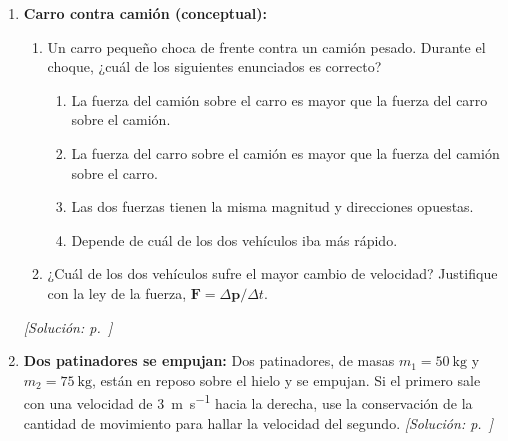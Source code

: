 \begin{enumerate}[label=\textbf{P\arabic*.}, ref=P\arabic*, leftmargin=*]
    \item\label{prob:parcial2-camion} \textbf{Carro contra camión
    (conceptual):}
    \begin{enumerate}[label=(\Roman*)]
        \item Un carro pequeño choca de frente contra un camión pesado.
        Durante el choque, ¿cuál de los siguientes enunciados es correcto?
        \begin{enumerate}[label=\alph*)]
            \item La fuerza del camión sobre el carro es mayor que la fuerza
            del carro sobre el camión.
            \item La fuerza del carro sobre el camión es mayor que la fuerza
            del camión sobre el carro.
            \item Las dos fuerzas tienen la misma magnitud y direcciones
            opuestas.
            \item Depende de cuál de los dos vehículos iba más rápido.
        \end{enumerate}
        \item ¿Cuál de los dos vehículos sufre el mayor cambio de velocidad?
        Justifique con la ley de la fuerza,
        $\boldsymbol{F} = \Delta\boldsymbol{p}/\Delta t$.
    \end{enumerate}
    \hfill\textit{[Solución: p.~\pageref{sol:parcial2-camion}]}

    \item\label{prob:parcial2-patinadores} \textbf{Dos patinadores se
    empujan:} Dos patinadores, de masas $m_1 = \SI{50}{\kilogram}$ y
    $m_2 = \SI{75}{\kilogram}$, están en reposo sobre el hielo y se empujan.
    Si el primero sale con una velocidad de \SI{3}{\meter\per\second} hacia
    la derecha, use la conservación de la cantidad de movimiento para hallar
    la velocidad del segundo.
    \hfill\textit{[Solución: p.~\pageref{sol:parcial2-patinadores}]}


\end{enumerate}
